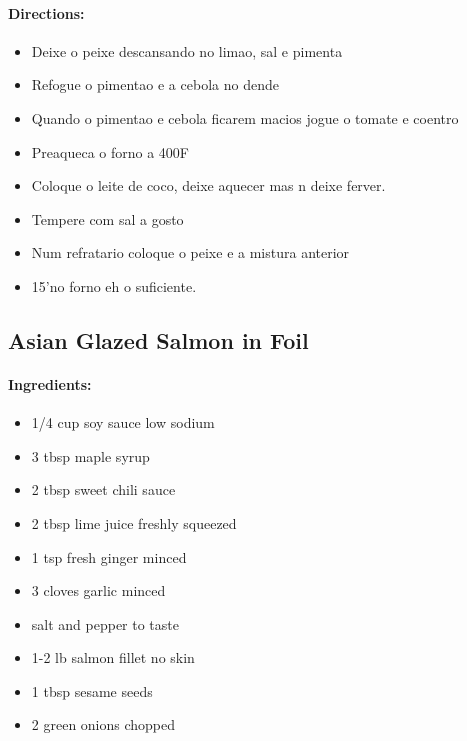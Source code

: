 \documentclass{article}
\begin{document}
\paragraph{Directions:}
\begin{itemize}
    \item Deixe o peixe descansando no limao, sal e pimenta
    \item Refogue o pimentao e a cebola no dende
    \item Quando o pimentao e cebola ficarem macios jogue o tomate e coentro
    \item Preaqueca o forno a 400F
    \item Coloque o leite de coco, deixe aquecer mas n deixe ferver.
    \item Tempere com sal a gosto
    \item Num refratario coloque o peixe e a mistura anterior
    \item 15'no forno eh o suficiente.
\end{itemize}

\subsection{Asian Glazed Salmon in Foil}

\paragraph{Ingredients:}
\begin{itemize}
    \item 1/4 cup soy sauce low sodium
    \item 3 tbsp maple syrup
    \item 2 tbsp sweet chili sauce
    \item 2 tbsp lime juice freshly squeezed
    \item 1 tsp fresh ginger minced
    \item 3 cloves garlic minced
    \item salt and pepper to taste
    \item 1-2 lb salmon fillet no skin
    \item 1 tbsp sesame seeds
    \item 2 green onions chopped
\end{itemize}
\end{document}
